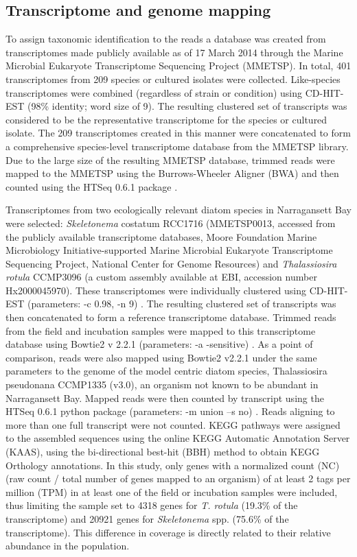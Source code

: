\subsection{Transcriptome and genome mapping}
To assign taxonomic identification to the reads a database was created from transcriptomes made publicly available as of 17 March 2014 through the Marine Microbial Eukaryote Transcriptome Sequencing Project (MMETSP). In total, 401 transcriptomes from 209 species or cultured isolates were collected. Like-species transcriptomes were combined (regardless of strain or condition) using CD-HIT-EST (98\% identity; word size of 9). The resulting clustered set of transcripts was considered to be the representative transcriptome for the species or cultured isolate. The 209 transcriptomes created in this manner were concatenated to form a comprehensive species-level transcriptome database from the MMETSP library. Due to the large size of the resulting MMETSP database, trimmed reads were mapped to the MMETSP using the Burrows-Wheeler Aligner (BWA) \citep{Li2010} and then counted using the HTSeq 0.6.1 package \citep{Anders2014}.\par 
Transcriptomes from two ecologically relevant diatom species in Narragansett Bay were selected: \textit{Skeletonema} costatum RCC1716 (MMETSP0013, accessed from the publicly available transcriptome databases, Moore Foundation Marine Microbiology Initiative-supported Marine Microbial Eukaryote Transcriptome Sequencing Project, National Center for Genome Resources) and \textit{Thalassiosira rotula} CCMP3096 (a custom assembly available at EBI, accession number Hx2000045970). These transcriptomes were individually clustered using CD-HIT-EST (parameters: -c 0.98, -n 9) \citep{Li2006}. The resulting clustered set of transcripts was then concatenated to form a reference transcriptome database. Trimmed reads from the field and incubation samples were mapped to this transcriptome database using Bowtie2 v 2.2.1 (parameters: -a -sensitive) \citep{Langmead2012}. As a point of comparison, reads were also mapped using Bowtie2 v2.2.1 under the same parameters to the genome of the model centric diatom species, Thalassiosira pseudonana CCMP1335 (v3.0), an organism not known to be abundant in Narragansett Bay. Mapped reads were then counted by transcript using the HTSeq 0.6.1 python package (parameters: -m union –s no) \citep{Anders2014}. Reads aligning to more than one full transcript were not counted. KEGG pathways were assigned to the assembled sequences using the online KEGG Automatic Annotation Server (KAAS), using the bi-directional best-hit (BBH) method to obtain KEGG Orthology annotations. In this study, only genes with a normalized count (NC) (raw count / total number of genes mapped to an organism) of at least 2 tags per million (TPM) in at least one of the field or incubation samples were included, thus limiting the sample set to 4318 genes for \textit{T. rotula} (19.3\% of the transcriptome) and 20921 genes for \textit{Skeletonema} spp. (75.6\% of the transcriptome). This difference in coverage is directly related to their relative abundance in the population.
